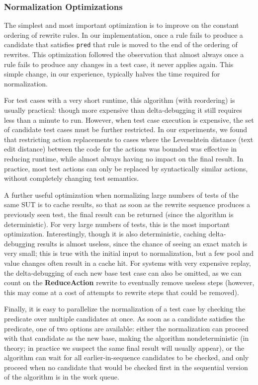 \subsubsection{Normalization Optimizations}

The simplest and most important optimization is to improve on the
constant ordering of rewrite rules.  In our implementation, once a
rule fails to produce a candidate that satisfies {\tt pred} that rule
is moved to the end of the ordering of rewrites.  This optimization
followed the observation that almost always once a rule fails to
produce any changes in a test case, it never applies again.  This
simple change, in our experience, typically halves the time required
for normalization.

For test cases with a very short runtime, this algorithm (with
reordering) is usually practical: though more expensive than delta-debugging
it still requires  less than a minute to run.  However, when test case
execution is expensive, the set of candidate test cases must be
further restricted.  In our experiments, we found that restricting
action replacements to cases where the Levenshtein \cite{Lev} distance
(text edit distance) between the code for the actions was bounded was effective in reducing runtime, while almost always having no
impact on the final result.  In practice, most test actions can only
be replaced by syntactically similar actions, without completely
changing test semantics.

A further useful optimization when normalizing large numbers of tests
of the same SUT is to cache results, so that as soon as the rewrite
sequence produces a previously seen test, the final result can be
returned (since the algorithm is deterministic).   For very large
numbers of tests, this is the most important optimization.
Interestingly, though it is also deterministic, caching
delta-debugging results is almost useless, since the chance of seeing
an exact match is very small; this is true with the initial input to
normalization, but a few pool and value changes often result in a
cache hit. For systems with
very expensive replay, the delta-debugging of each new base test case
can also be omitted, as we can count on the {\bf ReduceAction} rewrite to
eventually remove useless steps (however, this may come at a cost of
attempts to rewrite steps that could be removed).

Finally, it is easy to parallelize the normalization of a test case by
checking the predicate over multiple candidates at once.  As soon as a
candidate satisfies the predicate, one of two options are available:
either the normalization can proceed with that candidate as the new
base, making the algorithm nondeterministic (in theory; in
practice we suspect the same final result will usually appear), or the
algorithm can wait for all earlier-in-sequence candidates to be
checked, and only proceed when no candidate that would be checked
first in the sequential version of the algorithm is in the work
queue.

